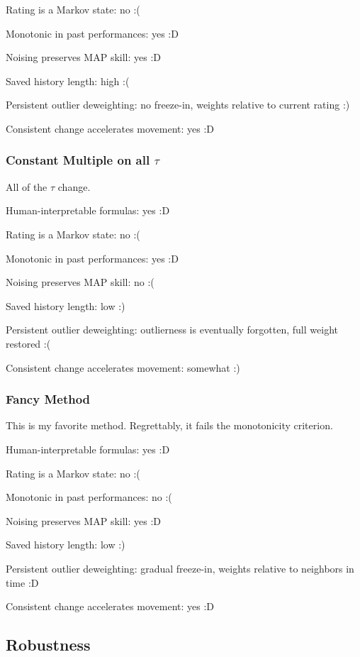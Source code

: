 Rating is a Markov state: no :(

Monotonic in past performances: yes :D

Noising preserves MAP skill: yes :D

Saved history length: high :(

Persistent outlier deweighting: no freeze-in, weights relative to current rating :)

Consistent change accelerates movement: yes :D

\subsubsection{Constant Multiple on all $\tau$}

All of the $\tau$ change.

Human-interpretable formulas: yes :D

Rating is a Markov state: no :(

Monotonic in past performances: yes :D

Noising preserves MAP skill: no :(

Saved history length: low :)

Persistent outlier deweighting: outlierness is eventually forgotten, full weight restored :(

Consistent change accelerates movement: somewhat :)

\subsubsection{Fancy Method}

This is my favorite method. Regrettably, it fails the monotonicity criterion.

Human-interpretable formulas: yes :D

Rating is a Markov state: no :(

Monotonic in past performances: no :(

Noising preserves MAP skill: yes :D

Saved history length: low :)

Persistent outlier deweighting: gradual freeze-in, weights relative to neighbors in time :D

Consistent change accelerates movement: yes :D

\subsection{Robustness}

